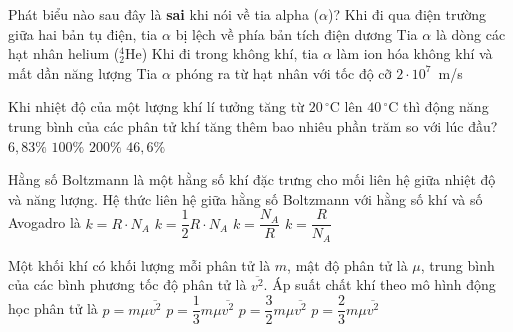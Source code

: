 	\begin{ex}%
		Phát biểu nào sau đây là \textbf{sai} khi nói về tia alpha ($\alpha$)?
		\choice
		{\True Khi đi qua điện trường giữa hai bản tụ điện, tia $\alpha$ bị lệch về phía bản tích điện dương}
		{Tia $\alpha$ là dòng các hạt nhân helium (${}^4_2\text{He}$)}
		{Khi đi trong không khí, tia $\alpha$ làm ion hóa không khí và mất dần năng lượng}
		{Tia $\alpha$ phóng ra từ hạt nhân với tốc độ cỡ $2\cdot 10^7$~m/s}
	\end{ex}

	\begin{ex}%
		Khi nhiệt độ của một lượng khí lí tưởng tăng từ $20\,^\circ\text{C}$ lên $40\,^\circ\text{C}$ thì động năng trung bình của các phân tử khí tăng thêm bao nhiêu phần trăm so với lúc đầu?
		\choice
		{\True $6{,}83\%$}
		{$100\%$}
		{$200\%$}
		{$46{,}6\%$}
	\end{ex}

	\begin{ex}%
		Hằng số Boltzmann là một hằng số khí đặc trưng cho mối liên hệ giữa nhiệt độ và năng lượng. Hệ thức liên hệ giữa hằng số Boltzmann với hằng số khí và số Avogadro là
		\choice
		{$k=R\cdot N_A$}
		{$k=\dfrac{1}{2}R\cdot N_A$}
		{$k=\dfrac{N_A}{R}$}
		{\True $k=\dfrac{R}{N_A}$}
	\end{ex}

	\begin{ex}%
		Một khối khí có khối lượng mỗi phân tử là $m$, mật độ phân tử là $\mu$, trung bình của các bình phương tốc độ phân tử là $\overline{v^2}$. Áp suất chất khí theo mô hình động học phân tử là
		\choice
		{$p=m\mu\overline{v^2}$}
		{\True $p=\dfrac{1}{3}m\mu\overline{v^2}$}
		{$p=\dfrac{3}{2}m\mu\overline{v^2}$}
		{$p=\dfrac{2}{3}m\mu\overline{v^2}$}
	\end{ex}

